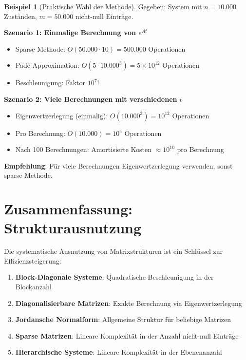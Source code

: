 \documentclass[a4paper,12pt]{report}
\theoremstyle{definition}
\newtheorem{beispiel}{Beispiel}
\begin{document}
	\begin{beispiel}[Praktische Wahl der Methode]
		Gegeben: System mit $n = 10.000$ Zuständen, $m = 50.000$ nicht-null Einträge.
		
		\textbf{Szenario 1: Einmalige Berechnung von $e^{At}$}
		\begin{itemize}
			\item Sparse Methode: $O(50.000 \cdot 10) = 500.000$ Operationen
			\item Padé-Approximation: $O(5 \cdot 10.000^3) = 5 \times 10^{12}$ Operationen
			\item Beschleunigung: Faktor $10^7$!
		\end{itemize}
		
		\textbf{Szenario 2: Viele Berechnungen mit verschiedenen $t$}
		\begin{itemize}
			\item Eigenwertzerlegung (einmalig): $O(10.000^3) = 10^{12}$ Operationen
			\item Pro Berechnung: $O(10.000) = 10^4$ Operationen
			\item Nach 100 Berechnungen: Amortisierte Kosten $\approx 10^{10}$ pro Berechnung
		\end{itemize}
		
		\textbf{Empfehlung}: Für viele Berechnungen Eigenwertzerlegung verwenden, sonst sparse Methode.
	\end{beispiel}
	
	\section{Zusammenfassung: Strukturausnutzung}
	
	Die systematische Ausnutzung von Matrixstrukturen ist ein Schlüssel zur Effizienzstei\-gerung:
	
	\begin{enumerate}
		\item \textbf{Block-Diagonale Systeme}: Quadratische Beschleunigung in der Blockanzahl
		\item \textbf{Diagonalisierbare Matrizen}: Exakte Berechnung via Eigenwertzerlegung
		\item \textbf{Jordansche Normalform}: Allgemeine Struktur für beliebige Matrizen
		\item \textbf{Sparse Matrizen}: Lineare Komplexität in der Anzahl nicht-null Einträge
		\item \textbf{Hierarchische Systeme}: Lineare Komplexität in der Ebenenanzahl
	\end{enumerate}
	
\end{document}
